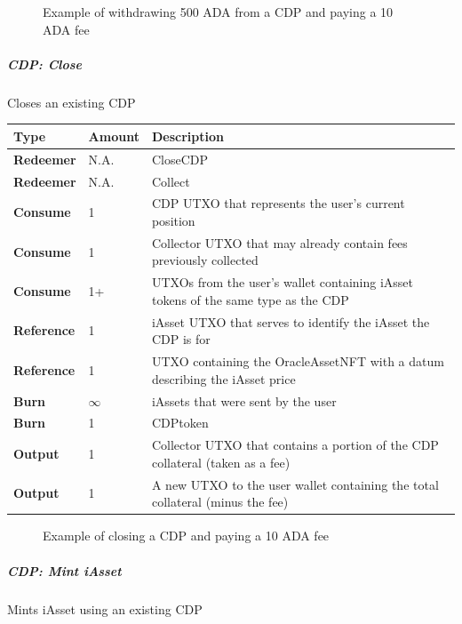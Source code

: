 \documentclass{article}
\begin{document}
\begin{sloppypar}
\filbreak

\hypertarget{cdp-withdraw-collateral-figure}{%
\begin{figure}[htbp]
\centering

\caption{Example of withdrawing 500 ADA from a CDP and paying a 10
ADA fee}
\label{cdp-withdraw-collateral-figure}
\end{figure}}

\hypertarget{cdp-close}{%
\subparagraph{CDP: Close}\label{cdp-close}}

Closes an existing CDP

\begin{tabularx}{\linewidth}{l|l|L}
\toprule
\textbf{Type} & \textbf{Amount} & \textbf{Description}
\tabularnewline
\midrule
\endhead
\textbf{Redeemer} & N.A. & CloseCDP
\tabularnewline
\midrule
\textbf{Redeemer} & N.A. & Collect
\tabularnewline
\midrule
\textbf{Consume} & 1 & CDP UTXO that represents the user's current
position
\tabularnewline
\midrule
\textbf{Consume} & 1 & Collector UTXO that may already contain fees
previously collected
\tabularnewline
\midrule
\textbf{Consume} & 1+ & UTXOs from the user's wallet containing iAsset
tokens of the same type as the CDP
\tabularnewline
\midrule
\textbf{Reference} & 1 & iAsset UTXO that serves to identify the iAsset
the CDP is for
\tabularnewline
\midrule
\textbf{Reference} & 1 & UTXO containing the OracleAssetNFT with a datum
describing the iAsset price
\tabularnewline
\midrule
\textbf{Burn} & \(\infty\) & iAssets that were sent by the
user
\tabularnewline
\midrule
\textbf{Burn} & 1 & CDPtoken
\tabularnewline
\midrule
\textbf{Output} & 1 & Collector UTXO that contains a portion of the CDP
collateral (taken as a fee)
\tabularnewline
\midrule
\textbf{Output} & 1 & A new UTXO to the user wallet containing the total
collateral (minus the fee)
\tabularnewline
\bottomrule
\end{tabularx}

\hypertarget{cdp-close-figure}{%
\begin{figure}[htbp]
\centering

\caption{Example of closing a CDP and paying a 10 ADA fee}
\label{cdp-close-figure}
\end{figure}}

\hypertarget{cdp-mint-iasset}{%
\subparagraph{CDP: Mint iAsset}\label{cdp-mint-iasset}}

Mints iAsset using an existing CDP


\end{sloppypar}
\end{document}
